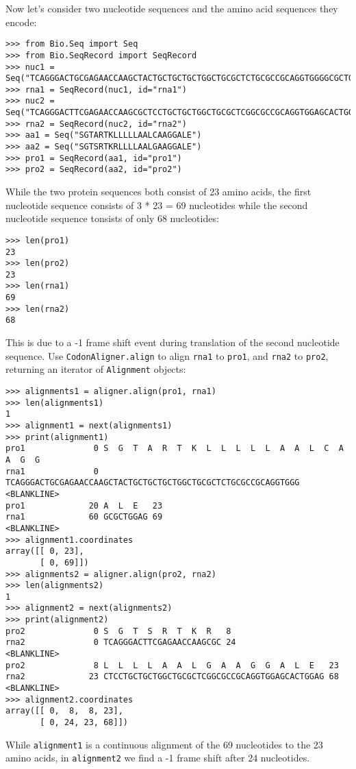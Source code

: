 Now let's consider two nucleotide sequences and the amino acid sequences they encode:
\begin{verbatim}
>>> from Bio.Seq import Seq
>>> from Bio.SeqRecord import SeqRecord
>>> nuc1 = Seq("TCAGGGACTGCGAGAACCAAGCTACTGCTGCTGCTGGCTGCGCTCTGCGCCGCAGGTGGGGCGCTGGAG")
>>> rna1 = SeqRecord(nuc1, id="rna1")
>>> nuc2 = Seq("TCAGGGACTTCGAGAACCAAGCGCTCCTGCTGCTGGCTGCGCTCGGCGCCGCAGGTGGAGCACTGGAG")
>>> rna2 = SeqRecord(nuc2, id="rna2")
>>> aa1 = Seq("SGTARTKLLLLLAALCAAGGALE")
>>> aa2 = Seq("SGTSRTKRLLLLAALGAAGGALE")
>>> pro1 = SeqRecord(aa1, id="pro1")
>>> pro2 = SeqRecord(aa2, id="pro2")
\end{verbatim}
While the two protein sequences both consist of 23 amino acids, the first nucleotide sequence consists of 3 * 23 = 69 nucleotides while the second nucleotide sequence tonsists of only 68 nucleotides:
\begin{verbatim}
>>> len(pro1)
23
>>> len(pro2)
23
>>> len(rna1)
69
>>> len(rna2)
68
\end{verbatim}
This is due to a -1 frame shift event during translation of the second nucleotide sequence. Use \verb+CodonAligner.align+ to align \verb+rna1+ to \verb+pro1+, and \verb+rna2+ to \verb+pro2+, returning an iterator of \verb+Alignment+ objects:
\begin{verbatim}
>>> alignments1 = aligner.align(pro1, rna1)
>>> len(alignments1)
1
>>> alignment1 = next(alignments1)
>>> print(alignment1)
pro1              0 S  G  T  A  R  T  K  L  L  L  L  L  A  A  L  C  A  A  G  G  
rna1              0 TCAGGGACTGCGAGAACCAAGCTACTGCTGCTGCTGGCTGCGCTCTGCGCCGCAGGTGGG
<BLANKLINE>
pro1             20 A  L  E   23
rna1             60 GCGCTGGAG 69
<BLANKLINE>
>>> alignment1.coordinates
array([[ 0, 23],
       [ 0, 69]])
>>> alignments2 = aligner.align(pro2, rna2)
>>> len(alignments2)
1
>>> alignment2 = next(alignments2)
>>> print(alignment2)
pro2              0 S  G  T  S  R  T  K  R   8
rna2              0 TCAGGGACTTCGAGAACCAAGCGC 24
<BLANKLINE>
pro2              8 L  L  L  L  A  A  L  G  A  A  G  G  A  L  E   23
rna2             23 CTCCTGCTGCTGGCTGCGCTCGGCGCCGCAGGTGGAGCACTGGAG 68
<BLANKLINE>
>>> alignment2.coordinates
array([[ 0,  8,  8, 23],
       [ 0, 24, 23, 68]])
\end{verbatim}
While \verb+alignment1+ is a continuous alignment of the 69 nucleotides to the 23 amino acids, in \verb+alignment2+ we find a -1 frame shift after 24 nucleotides.

